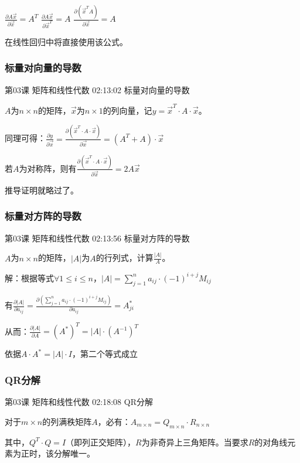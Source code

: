 \documentclass[UTF8]{ctexart}
\begin{document}
$\frac{\partial A \vec{x}}{\partial \vec{x}}=A^{T}$ \quad
$\frac{\partial A \vec{x}}{\partial \vec{x}^{T}}=A$ \quad
$\frac{\partial (\vec{x}^{T} A)}{\partial \vec{x}}=A$ \quad

在线性回归中将直接使用该公式。

\subsubsection{标量对向量的导数}

第03课 矩阵和线性代数 02:13:02 标量对向量的导数

$A$为$n \times n$的矩阵，$\vec{x}$为$n \times 1$的列向量，记$y=\vec{x}^{T} \cdot A \cdot \vec{x}$。

同理可得：$\frac{\partial y}{\partial \vec{x}}
=\frac{\partial (\vec{x}^{T} \cdot A \cdot \vec{x})}{\partial \vec{x}}
=(A^{T}+A) \cdot \vec{x}$

若$A$为对称阵，则有$\frac{\partial (\vec{x}^{T} \cdot A \cdot \vec{x})}{\partial \vec{x}}=2A\vec{x}$

推导证明就略过了。

\subsubsection{标量对方阵的导数}

第03课 矩阵和线性代数 02:13:56 标量对方阵的导数

$A$为$n \times n$的矩阵，$|A|$为$A$的行列式，计算$\frac{|A|}{A}$。

解：根据等式$\forall 1 \leq i \leq n$，$|A|=\sum_{j=1}^{n}a_{ij} \cdot (-1)^{i+j}M_{ij}$

有$\frac{\partial |A|}{\partial a_{ij}}=\frac{\partial (\sum_{j=1}^{n}a_{ij} \cdot (-1)^{i+j}M_{ij})}{\partial a_{ij}}=A_{ji}^{*}$

从而：$\frac{\partial |A|}{\partial A}=(A^{*})^{T}=|A| \cdot (A^{-1})^{T}$

依据$A \cdot A^{*} = |A| \cdot I$，第二个等式成立

\subsubsection{QR分解}

第03课 矩阵和线性代数 02:18:08 QR分解

对于$m \times n$的列满秩矩阵$A$，必有：$A_{m \times n}=Q_{m \times n} \cdot R_{n \times n}$

其中，$Q^{T} \cdot Q = I$（即列正交矩阵），$R$为非奇异上三角矩阵。当要求$R$的对角线元素为正时，该分解唯一。
\end{document}
